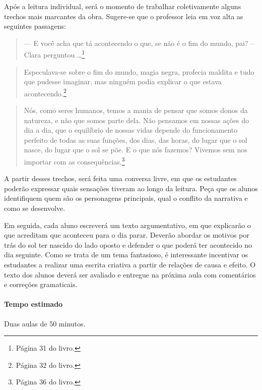 \documentclass[11pt]{extarticle}
\begin{document}

Após a leitura individual, será o momento de trabalhar coletivamente alguns trechos mais marcantes da obra. Sugere-se que o professor leia em voz alta as seguintes passagens:

\begin{quote}
— E você acha que tá acontecendo o que, se não é o fim do mundo, pai? – Clara perguntou \ldots{}\footnote{Página 31 do livro.}\end{quote}

\begin{quote}
Especulava-se sobre o fim do mundo, magia negra, profecia maldita e tudo que pudesse imaginar, mas ninguém podia explicar o que estava acontecendo.\footnote{Página 32 do livro.}\end{quote}

\begin{quote}
Nós, como seres humanos, temos a mania de pensar que somos donos da natureza, e não que somos parte dela. Não pensamos em nossas ações do dia a dia, que o equilíbrio de nossas vidas depende do funcionamento perfeito de todas as suas funções, dos dias, das horas, do lugar que o sol nasce, do lugar que o sol se põe. E o que nós fazemos? Vivemos sem nos importar com as consequências.\footnote{Página 36 do livro.}\end{quote}

A partir desses trechos, será feita uma conversa livre, em que os estudantes poderão expressar quais sensações tiveram ao longo da leitura. Peça que os alunos identifiquem quem são os personagens principais, qual o conflito da narrativa e como se desenvolve.


Em seguida, cada aluno escreverá um texto argumentativo, em que explicarão o que acreditam que aconteceu para o dia parar. Deverão abordar os motivos por trás do sol ter nascido do lado oposto e defender o que poderá ter acontecido no dia seguinte. Como se trata de um tema fantasioso, é interessante incentivar os estudantes a realizar uma escrita criativa a partir de relações de causa e efeito. O texto dos alunos deverá ser avaliado e entregue na próxima aula com comentários e correções gramaticais.

\paragraph{Tempo estimado} Duas aulas de 50 minutos.
\end{document}
